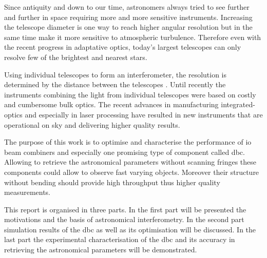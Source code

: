 Since antiquity and down to our time, astronomers always tried to see further and further in space requiring more and more sensitive instruments. Increasing the telescope diameter is one way to reach higher angular resolution but in the same time make it more sensitive to atmospheric turbulence. Therefore even with the recent progress in adaptative optics, today's largest telescopes can only resolve few of the brightest and nearest stars. 

Using individual telescopes to form an interferometer, the resolution is determined by the distance between the telescopes \citep{Glindemann}. Until recently the instruments combining the light from individual telescopes were based on costly and cumbersome bulk optics. The recent advances in manufacturing integrated-optics and especially in laser processing have resulted in new instruments that are operational on sky and delivering higher quality results. 

The purpose of this work is to optimise and characterise the performance of \gls{io} beam combiners and especially one promising type of component called \gls{dbc}. Allowing to retrieve the astronomical parameters without scanning fringes these components could allow to observe fast varying objects. Moreover their structure without bending should provide high throughput thus higher quality measurements. 

This report is organised in three parts. In the first part will be presented the motivations and the basis of astronomical interferometry. In the second part simulation results of the \gls{dbc} as well as its optimisation will be discussed. In the last part the experimental characterisation of the \gls{dbc} and its accuracy in retrieving the astronomical parameters will be demonstrated.
